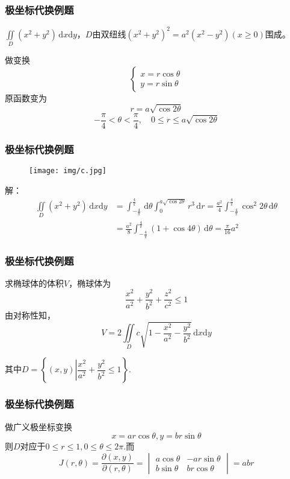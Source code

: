 \documentclass[xetex]{beamer}
\begin{document}
\begin{frame}
    \frametitle{极坐标代换例题}
    $\displaystyle \iint\limits_D(x^2+y^2)\,\mathrm{d}x\mathrm{d}y$，$D$由双纽线$(x^2+y^2)^2=a^2(x^2-y^2)(x\geq 0)$围成。\pause

    做变换
    $$\begin{cases}
        x=r\cos{\theta}\\
        y=r\sin{\theta}
    \end{cases}$$
    原函数变为
    $$r = a \sqrt{\cos{2 \theta}} $$
    $$- \frac{\pi}{4} < \theta < \frac{\pi}{4}, \quad 0 \leq r \leq a \sqrt{\cos{2 \theta}} $$
\end{frame}
    
\begin{frame}
    \frametitle{极坐标代换例题}
    \begin{figure}[ht]
        \centering %
       \texttt{[image: img/c.jpg]}
    \end{figure}
    \pause
    解：
    \begin{align*} 
        \iint \limits_D (x^2 + y^2) \,\mathrm{d}x\mathrm{d}y &= \int _{ - \frac{4}{\pi} } ^{ \frac{4}{\pi} } \,\mathrm{d} \theta \int _0 ^{a \sqrt{ \cos{2 \theta} } } r^3 \,\mathrm{d}r = \frac{a^2} {4} \int  _{ - \frac{4}{\pi} } ^{ \frac{4}{\pi} } \cos ^2 {2 \theta} \,\mathrm{d} \theta \\
        &= \frac {a^2} {8} \int _{ - \frac{4}{\pi} } ^{ \frac{4}{\pi} } (1+ \cos{4 \theta}) \,\mathrm{d} \theta = \frac{\pi} {16} a^2
    \end{align*}
\end{frame}

\begin{frame}
    \frametitle{极坐标代换例题}
    求椭球体的体积$V$，椭球体为
    $$\dfrac{x^2}{a^2}+\dfrac{y^2}{b^2}+\dfrac{z^2}{c^2}\leq1$$
    \pause
    由对称性知，
    $$V=2\iint\limits_Dc\sqrt{1-\frac{x^2}{a^2}-\frac{y^2}{b^2}}\,\mathrm{d}x\mathrm{d}y$$
    \begin{center}
    其中$D=\left\{(x,y) \left| \dfrac{x^2}{a^2}+\dfrac{y^2}{b^2}\leq1 \right.\right\}.$
    \end{center}
\end{frame}    

\begin{frame}
    \frametitle{极坐标代换例题}
    做广义极坐标变换
    $$x=ar\cos{\theta}, y=br\sin{\theta}$$
    则$D$对应于$0\leq r \leq1, 0\leq\theta\leq2\pi.$而
    $$J(r,\theta)=\dfrac{\partial (x,y)}{\partial (r,\theta)}=
        \begin{vmatrix}
             a\cos{\theta} & -ar\sin{\theta} \\
             b\sin{\theta} & br\cos{\theta}
         \end{vmatrix}
         =abr$$
\end{frame}  
\end{document}
